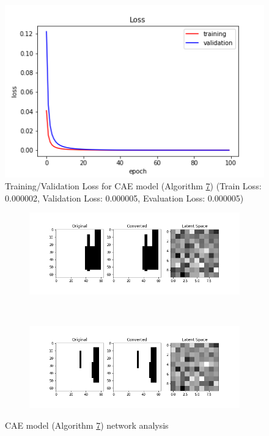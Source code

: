 \begin{figure}
    \centerfloat
    \includegraphics[scale=0.6]{images/cae_online_lstm/caelstm_section_cae_training_block_map_10000_model_loss.png}
    \caption{Training/Validation Loss for CAE model (Algorithm \hyperref[tab: evalalgorithms]{7}) (Train Loss: 0.000002, Validation Loss: 0.000005, Evaluation Loss: 0.000005)}
    \label{fig: gen_cae_7_train}
\end{figure}

\begin{figure}
    \centerfloat
    \begin{subfigure}[b]{1.25\linewidth}
        \includegraphics[width=\linewidth]{images/cae_online_lstm/caelstm_section_cae_training_block_map_10000_model_network_analysis_0.png}
    \end{subfigure}
    \\[-1.5cm]
    \begin{subfigure}[b]{1.25\linewidth}
        \includegraphics[width=\linewidth]{images/cae_online_lstm/caelstm_section_cae_training_block_map_10000_model_network_analysis_1.png}
    \end{subfigure}
    
    \caption{CAE model (Algorithm \hyperref[tab: evalalgorithms]{7}) network analysis}
    \label{fig: gen_cae_7_net_analysis}
\end{figure}


